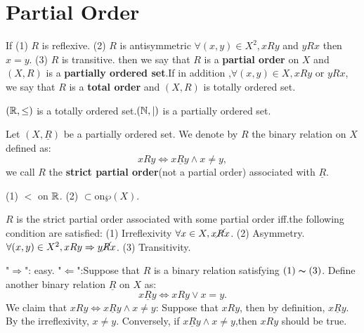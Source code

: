 \documentclass{book}
\numberwithin{equation}{section}
\begin{document}
\section{Partial Order}
\begin{definitionenv}
    If 
    \newline
    (1) $R$ is reflexive.
    \newline
    (2) $R$ is antisymmetric $\forall (x,y)\in X^2,xRy $ and $yRx$ then $x=y$.
    \newline
    (3) $R$ is transitive.
    \newline
    then we say that $R$ is a \textbf{partial order} on $X$ and $(X,R) $ is a \textbf{partially ordered set}.If in addition ,$\forall (x,y)\in X ,xRy$ or $yRx$, we say that $R$ is a \textbf{total order} and $(X,R)$ is totally ordered set. 
\end{definitionenv}
\begin{exampleenv}
    $(\mathbb{R} ,\le)$ is a totally ordered set.$(\mathbb{N} ,|)$ is a partially ordered set.  
\end{exampleenv}
\begin{definitionenv}
    Let $(X,\underline{R})$ be a partially ordered set. We denote by $R$ the binary relation on $X$ defined as:$$xRy \Leftrightarrow x\underline{R}y \wedge x\not=y,$$ we call $R$ the \textbf{strict partial order}(not a partial order) associated with $\underline{R}$.
\end{definitionenv}
\begin{exampleenv}
    \quad
    \newline
    (1) $<$ on $\mathbb{R}$.
    \newline
    (2) $\subset $on$ \wp (X)$.
\end{exampleenv}
\begin{propositionenv}
    $R$ is the strict partial order associated with some partial order iff.the following condition are satisfied:
    \newline
    (1) Irreflexivity $\forall x\in X,x \cancel{R}x$.
    \newline
    (2) Asymmetry.$\forall (x,y)\in X^2,xRy\Rightarrow y\cancel{R}x$.
    \newline
    (3) Transitivity.
\end{propositionenv}
\begin{proofenv}
    "$\Rightarrow$": easy.
    \newline
    "$\Leftarrow$":Suppose that $R$ is a binary relation satisfying $(1)\thicksim(3)$. Define another binary relation $\underline{R}$ on $X$ as:
    $$x\underline{R}y\Leftrightarrow xRy \vee x=y.$$
    We claim that $xRy\Leftrightarrow x\underline{R}y \wedge x\not= y$:
    \newline
    Suppose that $xRy$, then by definition, $x\underline{R}y$. By the irreflexivity, $x\not=y$.
    \newline
    Conversely, if $x\underline{R}y\wedge x\not=y$,then $xRy$ should be true.
\end{proofenv}
\end{document}
